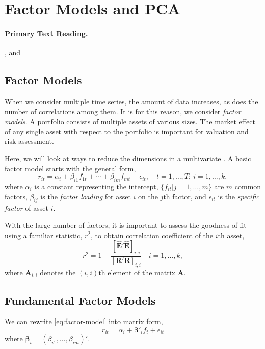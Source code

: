 \section{Factor Models and PCA}
\paragraph{Primary Text Reading.} ,
and 

\subsection{Factor Models}
When we consider multiple time series, the amount of data increases, as does the number of correlations among them. It is for this reason, we consider \emph{factor models}. A portfolio consists of multiple assets of various sizes. The market effect of any single asset with respect to the portfolio is important for valuation and risk assessment.

Here, we will look at ways to reduce the dimensions in a multivariate \fts{}. A basic factor model starts with the general form,
\begin{equation}
r_{it} = \alpha_i + \beta_{i1} f_{1t}+ \cdots + \beta_{im}f_{mt}+\epsilon_{it}, \quad t=1,\ldots,T; \: i=1,\ldots,k,
\label{eq:factor-model}
\end{equation}
where $\alpha_i$ is a constant representing the intercept, $\{f_{it}|j=1,\ldots,m \}$ are $m$ common factors, $\beta_{ij}$ is the \emph{factor loading} for asset $i$ on the $j$th factor, and $\epsilon_{it}$ is the \emph{specific factor} of asset $i$.

With the large number of factors, it is important to assess the goodness-of-fit using a familiar statistic, $r^2$, to obtain correlation coefficient of the $i$th asset,
\begin{equation}
r^2 = 1- \frac{[\hat{\mathbf{E}}'\hat{\mathbf{E}}]_{i,i}}{[\mathbf{R}'\mathbf{R}]_{i,i}} \quad i=1,\ldots,k,
\end{equation}
where $\mathbf{A}_{i,i}$ denotes the $(i,i)$th element of the matrix $\mathbf{A}$.

\subsection{Fundamental Factor Models}
We can rewrite \eqref{eq:factor-model} into matrix form,
\begin{equation}
r_{it}=\alpha_i + \mathbf{\beta}'_i f_t +\epsilon_{it}
\label{eq:fund-factor-model}
\end{equation}
where $\mathbf{\beta}_i=(\beta_{i1},\ldots,\beta_{im})'$.

